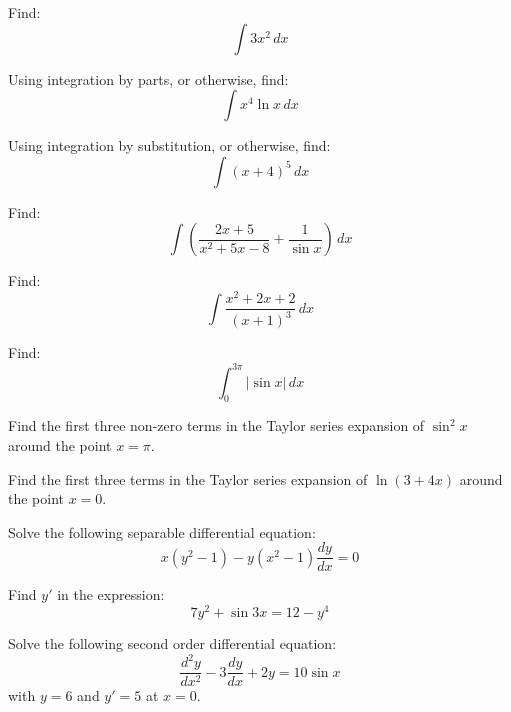 \documentclass[12pt]{exam}
\begin{document}
\begin{questions}
\question Find: $$\int{3x^2}\,dx$$

\question Using integration by parts, or otherwise, find: $$\int{x^{4}\ln{x}\,dx}$$

\question Using integration by substitution, or otherwise, find: $$\int{(x+4)^5}\,dx$$

\question Find:
$$\int{(\frac{2x+5}{x^2+5x-8}+\frac{1}{\sin{x}})\,dx}$$

\question Find:
$$\int \frac{x^2+2x+2}{(x+1)^3}\,dx$$

\question Find:
$$\int_{0}^{3\pi}|\sin{x}|\,dx$$

\question Find the first three non-zero terms in the Taylor series expansion of $\sin^{2}x$ around the point $x=\pi$.

\question Find the first three terms in the Taylor series expansion of $\ln{(3+4x)}$ around the point $x=0$.

\question Solve the following separable differential equation: $$x(y^{2}-1)-y(x^{2}-1)\frac{dy}{dx}=0$$

\question Find $y'$ in the expression:
$$7y^{2}+\sin{3x}=12-y^{4}$$

\question Solve the following second order differential equation: $$\frac{d^{2}y}{dx^{2}} - 3\frac{dy}{dx} +2y = 10\sin{x}$$ with $y = 6$ and $y' = 5$ at $x=0$.

\end{questions}
\end{document}
